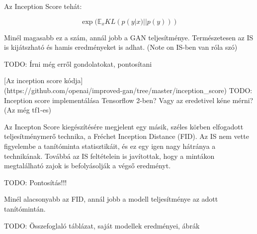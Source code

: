 Az Inception Score tehát:

$$ \exp(\mathbb{E}_x KL(p(y|x)||p(y))) $$

Minél magasabb ez a szám, annál jobb a GAN teljesítménye. Természetesen az IS is kijátszható és hamis eredményeket is adhat. (Note on IS-ben van róla szó)

TODO: Írni még erről gondolatokat, pontosítani

[Az inception score kódja]\\(https://github.com/openai/improved-gan/tree/master/inception\_score)
TODO: Inception score implementálása Tensorflow 2-ben? Vagy az eredetivel kéne mérni? (Az még tf1-es)


Az Incepton Score kiegészítésére megjelent egy másik, széles körben elfogadott teljesítménymerő technika, a Fréchet Inception Distance (FID). Az IS nem vette figyelembe a tanítóminta statisztikáit, és ez egy igen nagy hátránya a technikának. Továbbá az IS feltételein is javítottak, hogy a mintákon megtalálható zajok is befolyásolják a végső eredményt.

TODO: Pontosítás!!!

Minél alacsonyabb az FID, annál jobb a modell teljesítménye az adott tanítómintán.

TODO: Összefoglaló táblázat, saját modellek eredményei, ábrák